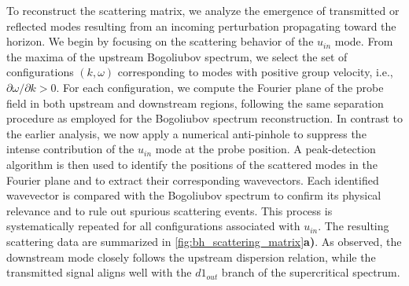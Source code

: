 To reconstruct the scattering matrix, we analyze the emergence of transmitted or reflected modes resulting from an incoming perturbation propagating toward the horizon. 
We begin by focusing on the scattering behavior of the \( u_{in} \) mode. 
From the maxima of the upstream Bogoliubov spectrum, we select the set of configurations \((k, \omega)\) corresponding to modes with positive group velocity, i.e., \(\partial\omega/\partial k > 0\). 
For each configuration, we compute the Fourier plane of the probe field in both upstream and downstream regions, following the same separation procedure as employed for the Bogoliubov spectrum reconstruction. 
In contrast to the earlier analysis, we now apply a numerical anti-pinhole to suppress the intense contribution of the \( u_{in} \) mode at the probe position. A peak-detection algorithm is then used to identify the positions of the scattered modes in the Fourier plane and to extract their corresponding wavevectors.
Each identified wavevector is compared with the Bogoliubov spectrum to confirm its physical relevance and to rule out spurious scattering events. This process is systematically repeated for all configurations associated with \( u_{in} \). The resulting scattering data are summarized in \autoref{fig:bh_scattering_matrix}\textbf{a)}. As observed, the downstream mode closely follows the upstream dispersion relation, while the transmitted signal aligns well with the \( d1_{out} \) branch of the supercritical spectrum.
